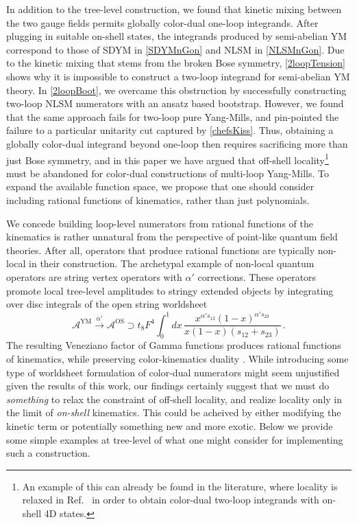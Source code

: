 \documentclass[11pt,letter]{article}
\def\be{\begin{equation}}
\def\ee{\end{equation}}
\begin{document}
In addition to the tree-level construction, we found that kinetic mixing
between the two gauge fields permits globally color-dual one-loop
integrands. After plugging in suitable on-shell states, the integrands
produced by semi-abelian YM correspond to those of SDYM in \cref{SDYMnGon} 
and NLSM in \cref{NLSMnGon}.  Due to the
kinetic mixing that stems from the broken Bose symmetry, \cref{2loopTension} shows why it is
impossible to construct a two-loop integrand for semi-abelian YM theory. In \cref{2loopBoot}, we overcame this obstruction by successfully constructing two-loop NLSM numerators with an ansatz based bootstrap. However, we found that the same approach fails for two-loop pure Yang-Mills, and pin-pointed the failure to a particular unitarity cut captured by \cref{chefsKiss}. Thus, obtaining a globally color-dual
integrand beyond one-loop then requires sacrificing more than just Bose
symmetry, and in this paper we have argued that off-shell locality\footnote{An example of this can already be found in the literature, where locality is relaxed in Ref.~\cite{Mogull:2015adi} in
  order to obtain color-dual two-loop integrands with on-shell 4D states.} must
be abandoned for color-dual constructions of multi-loop Yang-Mills. To expand the available function space, we propose that one should consider including rational functions of kinematics, rather than just polynomials.

We concede building loop-level numerators from rational functions of the kinematics
is rather unnatural from the perspective of point-like quantum field
theories. After all, operators that produce rational functions are typically non-local in their construction. The archetypal example of non-local quantum operators are string vertex operators with $\alpha'$ corrections. These operators promote local tree-level amplitudes to stringy extended objects by integrating over disc integrals of the open string worldsheet
\be
\mathcal{A}^{\text{YM}} \stackrel{\alpha'}{\longrightarrow} \mathcal{A}^{\text{OS}}\supset t_8 F^4 \int_0^1 dx \,\frac{ x^{\alpha' s_{12}}(1-x)^{\alpha' s_{23}}}{x(1-x)(s_{12}+s_{23})}\, .
\ee
The resulting Veneziano factor of Gamma functions produces rational functions of kinematics, while preserving color-kinematics duality \cite{MafraBCJAmplString,Broedel:2013tta,Mafra:2016mcc,Carrasco:2019yyn}. While introducing some type of worldsheet formulation of color-dual numerators might seem unjustified given the results of this work, our findings certainly suggest that we must do \textit{something} to relax the constraint of off-shell locality, and realize locality only in the limit of
\textit{on-shell} kinematics. This could be acheived by either modifying the kinetic term or potentially something new and more exotic. Below we provide some simple examples
at tree-level of what one might consider for implementing such a construction.
\end{document}
